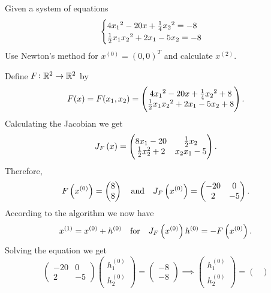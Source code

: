 \documentclass[11pt, a4paper]{article}
\begin{document}
\begin{exercise}
  Given a system of equations
  \[
    \begin{cases}
      4 {x_1}^2 - 20 x + \frac{1}{4} {x_2}^2 = -8 \\
      \frac{1}{2} x_1 {x_2}^2 + 2 x_1 - 5 x_2 = -8
    \end{cases}
  \]
  Use Newton's method for $x^{(0)} = (0,0)^T$ and calculate $x^{(2)}$.
\end{exercise}
\renewcommand{\arraystretch}{1.25}
\begin{solution}
  Define $F \colon \mathbb{R}^2 \to \mathbb{R}^2$ by
  \[
    F(x) = F(x_1,x_2) =
    \begin{pmatrix}
      4 {x_1}^2 - 20 x + \frac{1}{4} {x_2}^2 + 8 \\
      \frac{1}{2} x_1 {x_2}^2 + 2 x_1 - 5 x_2 + 8
    \end{pmatrix}.
  \]
  Calculating the Jacobian we get
  \[
    J_F\del{x} =
    \begin{pmatrix}
      8 x_1 - 20 & \half x_2 \\
      \half x_2^2 + 2 & x_2 x_1 - 5
    \end{pmatrix}.
  \]
  Therefore,
  \[
    F\del{x^{(0)}} =
    \begin{pmatrix}
      8 \\ 8
    \end{pmatrix} \tand
    J_F\del{x^{(0)}} =
    \begin{pmatrix}
      -20 & 0 \\
      2 & -5
    \end{pmatrix}.
  \]
  According to the algorithm we now have
  \[
    x^{(1)} = x^{(0)} + h^{(0)} \quad\text{for}\quad
    J_F\del{x^{(0)}} h^{(0)} = - F\del{x^{(0)}}.
  \]
  Solving the equation we get
  \[
    \begin{pmatrix}
      -20 & 0 \\
      2 & -5
    \end{pmatrix}
    \begin{pmatrix}
      h^{(0)}_1 \\ h^{(0)}_2
    \end{pmatrix} =
    \begin{pmatrix}
      -8 \\ -8
    \end{pmatrix} \implies
    \begin{pmatrix}
      h^{(0)}_1 \\ h^{(0)}_2
    \end{pmatrix} =
    \begin{pmatrix}

\end{pmatrix}\]
\end{solution}
\end{document}
